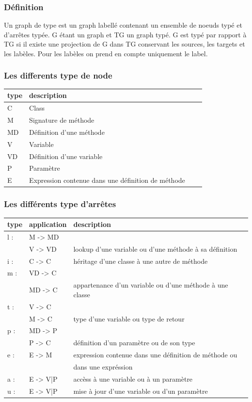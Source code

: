 \documentclass[a4paper, 12pt]{article}
\begin{document}
\subsubsection{Définition}
Un graph de type est un graph labellé contenant un ensemble de noeuds typé et d'arrêtes typée. G étant un graph et TG un graph typé. G est typé par rapport à TG si il existe une projection
de G dans TG conservant les sources, les targets et les labèles. Pour les labèles on prend en compte uniquement le label.

\subsubsection{Les differents type de node}

  \begin{tabular}{ | l | l | l | p{5cm} |}
    \hline
    type & description  \\ \hline
    C & Class   \\ \hline
    M & Signature de méthode   \\ \hline
    MD &  Définition d'une méthode   \\ \hline
    V &  Variable   \\ \hline
    VD &  Définition d'une variable \\ \hline
    P & Paramètre \\ \hline
    E &  Expression contenue dans une définition de méthode \\ \hline
    \end{tabular}

\subsubsection{Les différents type d'arrêtes}
  \begin{tabular}{ | l | l |  l |}
    \hline type & application & description  \\ \hline
    l : & M -> MD & \\ & V -> VD & lookup d'une variable ou d'une méthode à sa définition \\ \hline 
    i : & C -> C &  héritage d'une classe à une autre de méthode    \\ \hline
    m : & VD -> C & \\ & MD -> C & appartenance d'un variable ou d'une méthode à une classe  \\ \hline
    t : & V -> C  & \\ &  M -> C & type d'une variable ou type de retour    \\ \hline
    p : & MD -> P  & \\ &  P -> C & définition d'un paramètre ou de son type     \\ \hline
    e : & E -> M & expression contenue dans une définition de méthode ou \\ & &  dans une expréssion    \\ \hline
    a : & E -> {V|P} & accèss à une variable ou à un paramètre    \\ \hline
    u : & E -> {V|P} & mise à jour d'une variable ou d'un paramètre    \\ \hline
   \end{tabular}
\end{document}
